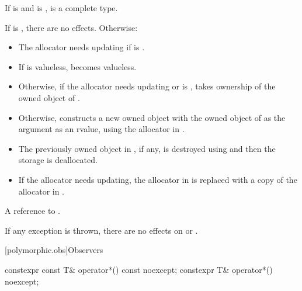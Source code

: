 \begin{itemdescr}
\pnum
\mandates
If
is  and
 is ,
 is a complete type.

\pnum
\effects
If  is , there are no effects.
Otherwise:

\begin{itemize}
\item
The allocator needs updating if
is .

\item
If  is valueless,  becomes valueless.

\item
Otherwise,
if the allocator needs updating or
 is ,
 takes ownership of the owned object of .

\item
Otherwise,
constructs a new owned object with the owned object of
 as the argument as an rvalue,
using the allocator in .

\item
The previously owned object in , if any,
is destroyed using  and
then the storage is deallocated.

\item
If the allocator needs updating,
the allocator in  is replaced with
a copy of the allocator in .
\end{itemize}

\pnum
\returns
A reference to .

\pnum
\remarks
If any exception is thrown,
there are no effects on  or .
\end{itemdescr}

[polymorphic.obs]{Observers}

%
\begin{itemdecl}
constexpr const T& operator*() const noexcept;
constexpr T& operator*() noexcept;
\end{itemdecl}

